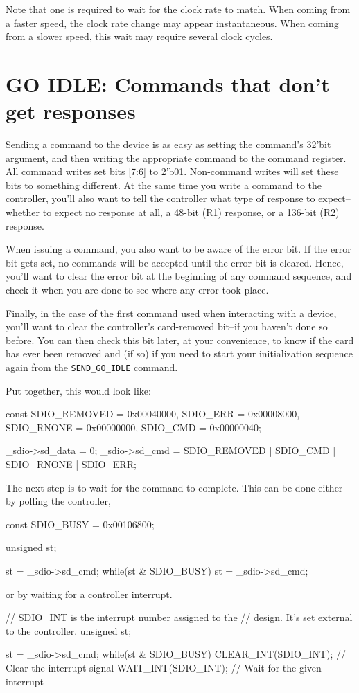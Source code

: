 \documentclass{gqtekspec}
\begin{document}
Note that one is required to wait for the clock rate to match.  When coming
from a faster speed, the clock rate change may appear instantaneous.  When
coming from a slower speed, this wait may require several clock cycles.
\section{GO IDLE: Commands that don't get responses}
Sending a command to the device is as easy as setting the command's 32'bit
argument, and then writing the appropriate command to the command register.
All command writes set bits [7:6] to 2'b01.  Non-command writes will set these
bits to something different.  At the same time you write a command to the
controller, you'll also want to tell the controller what type of
response to expect--whether to expect no response at all, a 48-bit (R1)
response, or a 136-bit (R2) response.

When issuing a command, you also want to be aware of the error bit.  If the
error bit gets set, no commands will be accepted until the error bit is cleared.
Hence, you'll want to clear the error bit at the beginning of any command
sequence, and check it when you are done to see where any error took place.

Finally, in the case of the first command used when interacting with a device,
you'll want to clear the controller's card-removed bit--if you haven't done
so before.  You can then check this bit later, at your convenience, to know
if the card has ever been removed and (if so) if you need to start your
initialization sequence again from the {\tt SEND\_GO\_IDLE} command.

Put together, this would look like:
\begin{zCpp}
	const	SDIO_REMOVED = 0x00040000,
		SDIO_ERR     = 0x00008000,
		SDIO_RNONE   = 0x00000000,
		SDIO_CMD     = 0x00000040;

	_sdio->sd_data = 0;
	_sdio->sd_cmd  = SDIO_REMOVED | SDIO_CMD | SDIO_RNONE | SDIO_ERR;
\end{zCpp}

The next step is to wait for the command to complete.  This can be done either
by polling the controller,
\begin{zCpp}
	const	SDIO_BUSY    = 0x00106800;

	unsigned	st;

	st = _sdio->sd_cmd;
	while(st & SDIO_BUSY)
		st = _sdio->sd_cmd;
\end{zCpp}
or by waiting for a controller interrupt.
\begin{zCpp}
	// SDIO_INT is the interrupt number assigned to the
	// design.  It's set external to the controller.
	unsigned	st;

	st = _sdio->sd_cmd;
	while(st & SDIO_BUSY) {
		CLEAR_INT(SDIO_INT);	// Clear the interrupt signal
		WAIT_INT(SDIO_INT);	// Wait for the given interrupt
	}
\end{zCpp}
\end{document}
